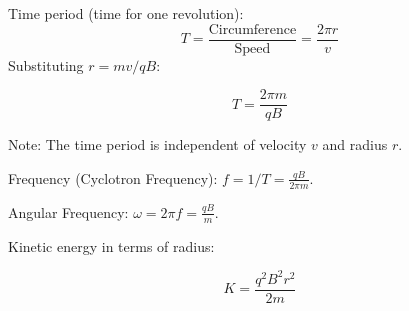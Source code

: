 \begin{frame}[t]
      \item<+-> Time period (time for one revolution):
          \begin{equation*} T = \frac{\text{Circumference}}{\text{Speed}} = \frac{2\pi r}{v} \end{equation*}
        Substituting $r = mv/qB$:
        \begin{tcolorbox}[colback=blue!5,colframe=blue!80,boxrule=0.5pt,arc=1mm,boxsep=1pt]
        \begin{equation*}
             T = \frac{2\pi m}{qB}
        \end{equation*}
        \end{tcolorbox}
          Note: The time period is independent of velocity $v$ and radius $r$.
      \item<+-> Frequency (Cyclotron Frequency): $f = 1/T = \frac{qB}{2\pi m}$.
    \item<+-> Angular Frequency: $\omega = 2\pi f = \frac{qB}{m}$.

      \item<+-> Kinetic energy in terms of radius:
        \begin{tcolorbox}[colback=blue!5,colframe=blue!80,boxrule=0.5pt,arc=1mm,boxsep=1pt]
        \begin{equation*}
            K = \frac{q^2 B^2 r^2}{2m}
        \end{equation*}
          \end{tcolorbox}
\end{frame}

\transfade[duration=0.5]

